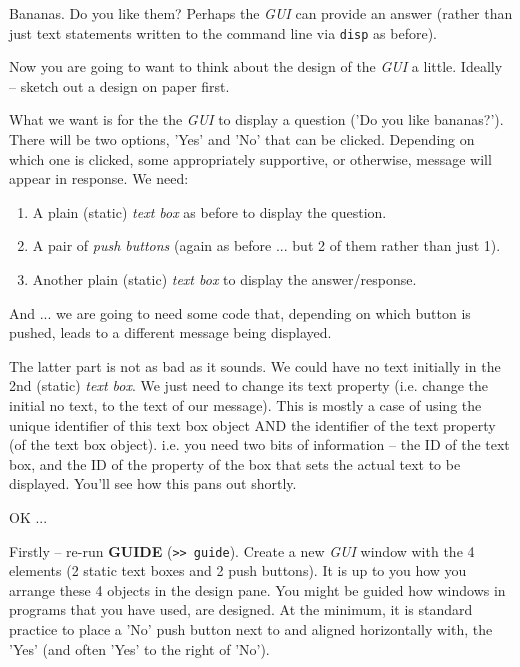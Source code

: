 \documentclass{tufte-book} %
\begin{document}
Bananas. Do you like them? Perhaps the \textit{GUI} can provide an answer (rather than just text statements written  to the command line via \texttt{disp} as before).

Now you are going to want to think about the design of the \textit{GUI} a little. Ideally -- sketch out a design on paper first.

What we want is for the the \textit{GUI} to display a question ('Do you like bananas?'). There will be two options, 'Yes' and 'No' that can be clicked. Depending on which one is clicked, some appropriately supportive, or otherwise, message will appear in response. We need:
\vspace{-1mm}\begin{enumerate}[noitemsep]
\setlength{\itemindent}{.2in}
\item A plain (static) \textit{text box} as before to display the question.
\item A pair of \textit{push buttons} (again as before ... but 2 of them rather than just 1).
\item Another plain (static) \textit{text box} to display the answer/response.
\end{enumerate}\vspace{-1mm}
And ... we are going to need some code that, depending on which button is pushed, leads to a different message being displayed.

The latter part is not as bad as it sounds. We could have no text initially in the 2nd (static) \textit{text box}. We just need to change its text property (i.e. change the initial no text, to the text of our message). This is mostly a case of  using the unique identifier of this text box object AND the identifier of the text property (of the text box object). i.e. you need two bits of information -- the ID of the text box, and the ID of the property of the box that sets the actual text to be displayed. You'll see how this pans out shortly.

OK ...

Firstly -- re-run \textbf{GUIDE} (\texttt{>> guide}). Create a new \textit{GUI} window with the 4 elements (2 static text boxes and 2 push buttons). It is up to you how you arrange these 4 objects in the design pane. You might be guided how windows in programs that you have used, are designed. At the minimum, it is standard practice to place a 'No' push button next to and aligned horizontally with, the 'Yes' (and often 'Yes' to the right of 'No').
\end{document}
